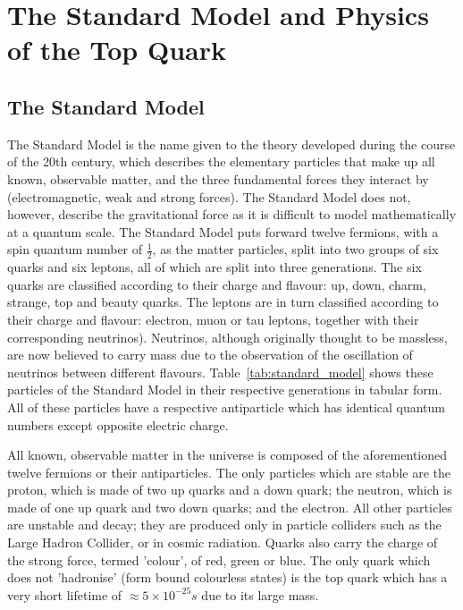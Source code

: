 \chapter{The Standard Model and Physics of the Top Quark}
\label{c:the_standard_model_and_top_physics}

\section{The Standard Model}
\label{s:the_standard_model}

The Standard Model is the name given to the theory developed during the course of the 20th century, which
describes the elementary particles that make up all known, observable matter, and the three fundamental forces
they interact by (electromagnetic, weak and strong forces). The Standard Model does not, however, describe the
gravitational force as it is difficult to model mathematically at a quantum scale.
The Standard Model puts forward twelve fermions, with a spin quantum number of $\frac{1}{2}$, as the matter
particles, split into two groups of six quarks and six leptons, all of which are split into three generations.
The six quarks are classified according to their charge and flavour: up, down, charm, strange, top and beauty
quarks. The leptons are in turn classified according to their charge and flavour: electron, muon or tau
leptons, together with their corresponding neutrinos). Neutrinos, although originally thought to be massless,
are now believed to carry mass due to the observation of the oscillation of neutrinos between different
flavours. Table~\ref{tab:standard_model} shows these particles of the Standard Model in their respective
generations in tabular form. All of these particles have a respective antiparticle which has identical quantum
numbers except opposite electric charge.



All known, observable matter in the universe is composed of the aforementioned twelve fermions or their
antiparticles. The only particles which are stable are the proton, which is made of two up quarks and a down
quark; the neutron, which is made of one up quark and two down quarks; and the electron. All other particles
are unstable and decay; they are produced only in particle colliders such as the Large Hadron Collider, or in
cosmic radiation. Quarks also carry the charge of the strong force, termed 'colour', of red, green or blue.
The only quark which does not 'hadronise' (form bound colourless states) is the top quark which has a
very short lifetime of $\approx 5 \times 10^{-25}s$ \cite{Agashe:2014kda} due to its large mass.

